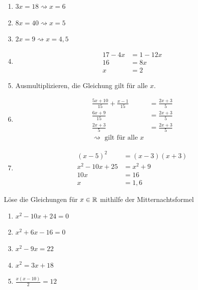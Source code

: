 \begin{lsg}{}
  \begin{multicols}{2}
	  \begin{enumerate}
      \item $3x = 18 \rightsquigarrow x = 6$
      \item $8x = 40 \rightsquigarrow x = 5$
      \item $2x = 9 \rightsquigarrow x = 4,5$
			\item \begin{align*}
				17-4x &= 1-12x\\
				16 &= 8x\\
				x &= 2
			\end{align*}
      \item Ausmultiplizieren, die Gleichung gilt für alle $x$.
      \item \begin{align*}
        \frac{5x+10}{15} + \frac{x-1}{15} &= \frac{2x+3}{5}\\
        \frac{6x+9}{15} &= \frac{2x+3}{5}\\
        \frac{2x+3}{5} &= \frac{2x+3}{5}\\
        \rightsquigarrow \text{ gilt für alle }x&
      \end{align*}
			\item \begin{align*}
				(x-5)^2 &= (x-3)(x+3)\\
				x^2-10x+25 &= x^2+9\\
				10x &= 16\\
				x &= 1,6
			\end{align*}
    \end{enumerate}
  \end{multicols}
\end{lsg}

 Löse die Gleichungen für $x\in \mathbb{R}$ mithilfe der Mitternachtsformel
\begin{multicols}{3}
  \begin{enumerate}
    \item $x^2 - 10x + 24 = 0$
    \item $x^2 + 6x - 16 = 0$
    \item $x^2 - 9x = 22$
    \item $x^2 = 3x + 18$
    \item $\frac{x(x-10)}{2} = 12$
  \end{enumerate}
\end{multicols}

